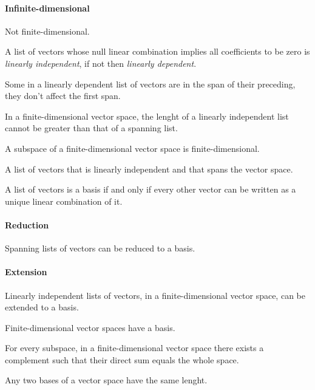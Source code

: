 \begin{multicols}{3}
  \paragraph{\textbf{Infinite-dimensional}}
  Not finite-dimensional.
  
  A list of vectors whose null linear combination implies all coefficients to be zero is \textit{linearly independent},
  if not then \textit{linearly dependent}.

  Some in a linearly dependent list of vectors are in the span of their preceding, they don't affect the first span.
  
  In a finite-dimensional vector space, the lenght of a linearly independent list cannot be greater than that of a spanning list.
  
  A subspace of a finite-dimensional vector space is finite-dimensional.
  
  A list of vectors that is linearly independent and that spans the vector space.
  
  A list of vectors is a basis if and only if every other vector can be written as a unique linear combination of it.
  
  \paragraph{\textbf{Reduction}}
  Spanning lists of vectors can be reduced to a basis.
  \paragraph{\textbf{Extension}}
  Linearly independent lists of vectors, in a finite-dimensional vector space, can be extended to a basis.

  Finite-dimensional vector spaces have a basis.
  
  For every subspace, in a finite-dimensional vector space there exists a complement such that their direct sum equals the whole space.
  
  Any two bases of a vector space have the same lenght.
  

\end{multicols}
